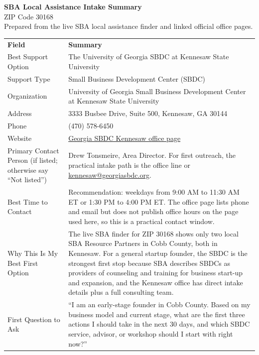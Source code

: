 \documentclass[11pt]{article}
\begin{document}
\begin{center}
{\LARGE\bfseries SBA Local Assistance Intake Summary}\\[3pt]
{\large ZIP Code 30168}\\[3pt]
\small Prepared from the live SBA local assistance finder and linked official office pages.
\end{center}

\begin{tabularx}{\textwidth}{L{0.33\textwidth}Y}
\textbf{Field} & \textbf{Summary} \\
Best Support Option & The University of Georgia SBDC at Kennesaw State University \\
Support Type & Small Business Development Center (SBDC) \\
Organization & University of Georgia Small Business Development Center at Kennesaw State University \\
Address & 3333 Busbee Drive, Suite 500, Kennesaw, GA 30144 \\
Phone & (470) 578-6450 \\
Website & \href{https://georgiasbdc.org/locations/kennesaw-office/}{Georgia SBDC Kennesaw office page} \\
Primary Contact Person (if listed; otherwise say ``Not listed'') & Drew Tonsmeire, Area Director. For first outreach, the practical intake path is the office line or \href{mailto:kennesaw@georgiasbdc.org}{kennesaw@georgiasbdc.org}. \\
Best Time to Contact & Recommendation: weekdays from 9:00 AM to 11:30 AM ET or 1:30 PM to 4:00 PM ET. The office page lists phone and email but does not publish office hours on the page used here, so this is a practical contact window. \\
Why This Is My Best First Option & The live SBA finder for ZIP 30168 shows only two local SBA Resource Partners in Cobb County, both in Kennesaw. For a general startup founder, the SBDC is the strongest first stop because SBA describes SBDCs as providers of counseling and training for business start-up and expansion, and the Kennesaw office has direct intake details plus a full consulting team. \\
First Question to Ask & ``I am an early-stage founder in Cobb County. Based on my business model and current stage, what are the first three actions I should take in the next 30 days, and which SBDC service, advisor, or workshop should I start with right now?'' \\
\end{tabularx}
\end{document}
